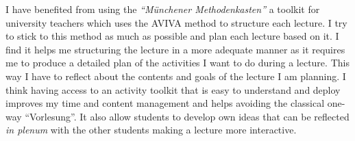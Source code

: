 \documentclass[a4paper,11pt]{article}
\begin{document}
I have benefited from using the \emph{``M\"unchener Methodenkasten''} a toolkit for university teachers which uses the AVIVA method to structure each lecture. I try to stick to this method as much as possible and plan each lecture based on it. I find it helps me structuring the lecture in a more adequate manner as it requires me to produce a detailed plan of the activities I want to do during a lecture. This way I have to reflect about the contents and goals of the lecture I am planning. I think having access to an activity toolkit that is easy to understand and deploy improves my time and content management and helps avoiding the classical one-way ``Vorlesung''. It also allow students to develop own ideas that can be reflected \emph{in plenum} with the other students making a lecture more interactive.\\
\end{document}
